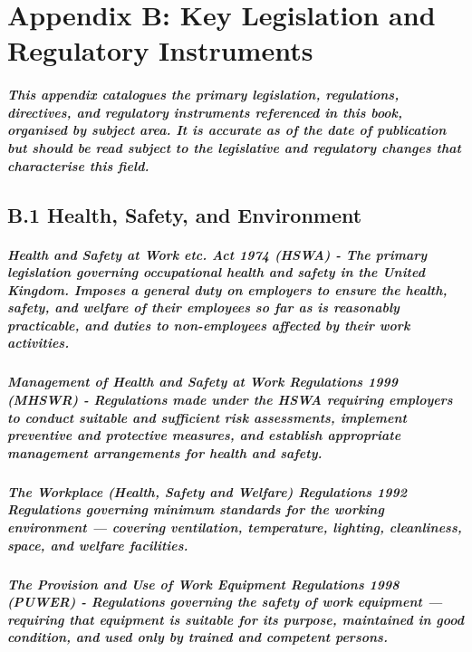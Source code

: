 \chapter*{Appendix B: Key Legislation and Regulatory Instruments}
\label{chap:Appendix B: Key Legislation and Regulatory Instruments}

\paragraph{This appendix catalogues the primary legislation, regulations, directives, and regulatory instruments referenced in this book, organised by subject area. It is accurate as of the date of publication but should be read subject to the legislative and regulatory changes that characterise this field.}

\section*{B.1 Health, Safety, and Environment}
\paragraph{\textbf{Health and Safety at Work etc. Act 1974 (HSWA)} - The primary legislation governing occupational health and safety in the United Kingdom. Imposes a general duty on employers to ensure the health, safety, and welfare of their employees so far as is reasonably practicable, and duties to non-employees affected by their work activities.}
\paragraph{\textbf{Management of Health and Safety at Work Regulations 1999 (MHSWR)} - Regulations made under the HSWA requiring employers to conduct suitable and sufficient risk assessments, implement preventive and protective measures, and establish appropriate management arrangements for health and safety.}
\paragraph{\textbf{The Workplace (Health, Safety and Welfare) Regulations 1992} Regulations governing minimum standards for the working environment — covering ventilation, temperature, lighting, cleanliness, space, and welfare facilities.}
\paragraph{\textbf{The Provision and Use of Work Equipment Regulations 1998 (PUWER)} - Regulations governing the safety of work equipment — requiring that equipment is suitable for its purpose, maintained in good condition, and used only by trained and competent persons.}
